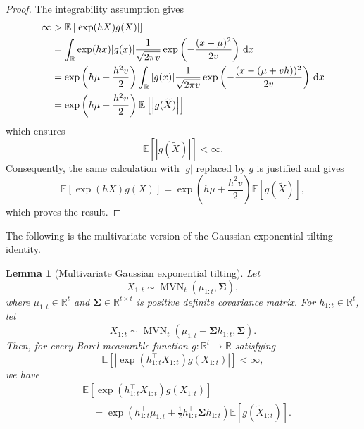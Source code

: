 \documentclass[11pt,authoryear]{elsarticle}
\def\Real{\mathbb{R}}
\def\E#1{{\mathbb E}\left[#1\right]}
\newtheorem{lemma}{Lemma}
\theoremstyle{nopunct}
\numberwithin{equation}{section}
\begin{document}
\begin{proof}

The integrability assumption gives
\[
\begin{aligned}
\infty
&>
\E{
\left|
\exp(hX)g(X)
\right|
}\\
&=
\int_{\Real}
\exp(hx)|g(x)|
\frac{1}{\sqrt{2\pi v}}
\exp\left(
-\frac{(x-\mu)^2}{2v}
\right)
\,{\rm d}x\\
&=
\exp\left(
h\mu+\frac{h^2v}{2}
\right)
\int_{\Real}
|g(x)|
\frac{1}{\sqrt{2\pi v}}
\exp\left(
-\frac{(x-(\mu+vh))^2}{2v}
\right)
\,{\rm d}x\\
&=
\exp\left(
h\mu+\frac{h^2v}{2}
\right)
\E{
\left\vert g(\widetilde X)\right\vert
}
\end{aligned}
\]
which ensures
\[
\E{\left\vert g(\widetilde X) \right\vert }<\infty.
\]
Consequently, the same calculation with \(|g|\) replaced by \(g\) is
justified and gives
\[
\E{
\exp(hX)g(X)
}
=
\exp\left(
h\mu+\frac{h^2v}{2}
\right)
\E{
g(\widetilde X)
},
\]
which proves the result.
\end{proof}


The following is the multivariate version of the Gaussian exponential
tilting identity.

\begin{lemma}[Multivariate Gaussian exponential tilting]
\label{lem.3}
Let
\[
X_{1:t}
\sim
\operatorname{MVN}_t(\mu_{1:t},\boldsymbol\Sigma),
\]
where \(\mu_{1:t}\in\Real^t\) and
\(\boldsymbol\Sigma\in\Real^{t\times t}\) is positive definite covariance matrix. For
\(h_{1:t}\in\Real^t\), let
\[
\widetilde X_{1:t}
\sim
\operatorname{MVN}_t
\left(
\mu_{1:t}+\boldsymbol\Sigma h_{1:t},
\boldsymbol\Sigma
\right).
\]
Then, for every Borel-measurable function
\(g:\Real^t\to\Real\) satisfying
\[
\E{
\left|
\exp\left(h_{1:t}^{\top}X_{1:t}\right)
g(X_{1:t})
\right|
}
<\infty,
\]
we have
\[
\begin{aligned}
&\E{
\exp\left(h_{1:t}^{\top}X_{1:t}\right)
g(X_{1:t})
}\\
&\quad =
\exp\left(
h_{1:t}^{\top}\mu_{1:t}
+
\frac12
h_{1:t}^{\top}\boldsymbol\Sigma h_{1:t}
\right)
\E{
g(\widetilde X_{1:t})
}.
\end{aligned}
\]
\end{lemma}
\end{document}
